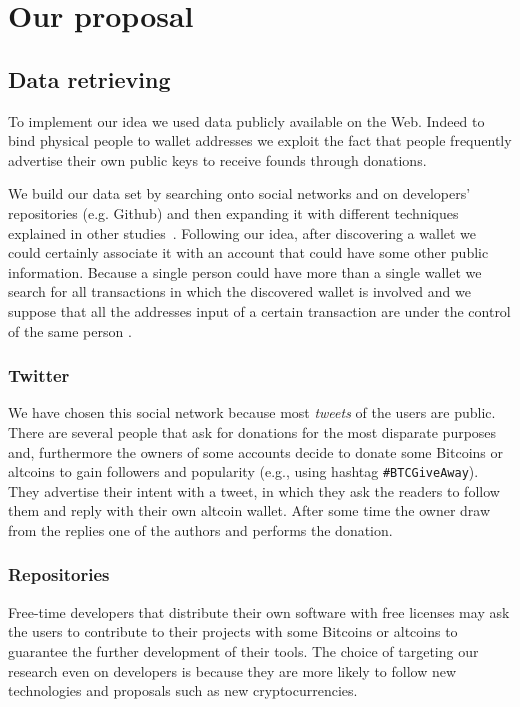 \section{Our proposal}
\label{proposal}

\subsection{Data retrieving}
To implement our idea we used data publicly available on the Web. Indeed
to bind physical people to wallet addresses we exploit the fact that
people frequently advertise their own public keys to receive founds
through donations.

We build our data set by searching onto social networks and on developers'
repositories (e.g. Github) and then expanding it with different techniques
explained in other studies~\cite{bib:fistful}. Following our idea, after
discovering a wallet we could certainly associate it with an account that could
have some other public information. Because a single person could have more
than a single wallet we search for all transactions in which the
discovered wallet is involved
and we suppose that all the addresses input of a certain transaction are under
the control of the same person \cite{bib:satoshi, bib:deanon, bib:fistful}.

\subsubsection*{Twitter}
We have chosen this social network because most \textit{tweets} of the users are
public. There are several people that ask for donations for the most disparate
purposes and, furthermore the owners of some accounts decide to donate some
Bitcoins or altcoins to gain followers and popularity (e.g., using hashtag
\texttt{\#BTCGiveAway}). They advertise their intent with a tweet, in which
they ask the readers to follow them and reply with their own altcoin wallet.
After some time the owner draw from the replies one of the authors and performs
the donation.

\subsubsection*{Repositories}
Free-time developers that distribute their own software with free licenses may
ask the users to contribute to their projects with some Bitcoins or altcoins to
guarantee the further development of their tools. The choice of targeting our
research even on developers is because they are more likely to follow new
technologies and proposals such as new cryptocurrencies.

